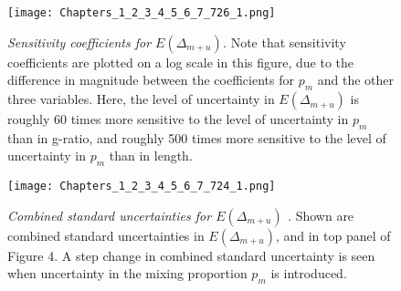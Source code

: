 \begin{figure}[h!]
\begin{center}
\texttt{[image: Chapters\_1\_2\_3\_4\_5\_6\_7\_726\_1.png]}%
\end{center}
\caption[\emph{Sensitivity coefficients for $E(\Delta_{m+u})$.}]{\emph{Sensitivity coefficients for $E(\Delta_{m+u})$.}
Note that sensitivity coefficients are plotted on a log scale in this figure, due to the difference in magnitude between the coefficients for \( p_{m} \) and the other three variables. Here, the level of uncertainty in \( E(\Delta_{m+u} ) \) is roughly 60 times more sensitive to the level of uncertainty in \(p_{m}\) than in g-ratio, and roughly 500 times more sensitive to the level of uncertainty in \(p_{m}\) than in length. } \label{fig:7}
\end{figure}



\begin{figure}[h!]
\begin{center}
\texttt{[image: Chapters\_1\_2\_3\_4\_5\_6\_7\_724\_1.png]}%
\end{center}
\caption[\emph{Combined standard uncertainties for $E(\Delta_{m+u})$ .}]{\emph{Combined standard uncertainties for $E(\Delta_{m+u})$ .}
Shown are combined standard uncertainties in \( E(\Delta_{m+u}) \), and in top panel of Figure 4. A step change in combined standard uncertainty is seen when 
uncertainty in the mixing proportion \( p_{m} \) is introduced.} \label{fig:6}
\end{figure}









    
    
    
    
    

